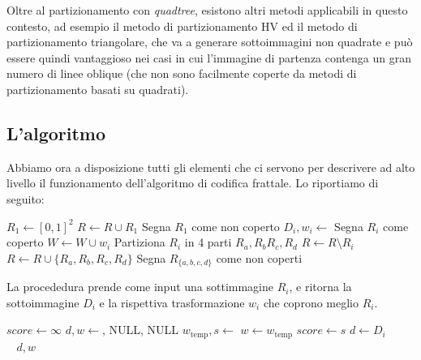 \documentclass[11pt,a4paper,appendixprefix=true,numbers=noenddot]{scrreprt}
\begin{document}
Oltre al partizionamento con \emph{quadtree}, esistono altri metodi applicabili in questo contesto, ad esempio il metodo di partizionamento HV ed il metodo di partizionamento triangolare, che va a generare sottoimmagini non quadrate e può essere quindi vantaggioso nei casi in cui l'immagine di partenza contenga un gran numero di linee oblique (che non sono facilmente coperte da metodi di partizionamento basati su quadrati).

\subsection*{L'algoritmo}

Abbiamo ora a disposizione tutti gli elementi che ci servono per descrivere ad alto livello il funzionamento dell'algoritmo di codifica frattale. Lo riportiamo di seguito:

\begin{framed}
\begin{algorithmic}
\State $R_1 \gets [0,1]^2$
\State $R \gets R \cup R_1$
\State Segna $R_1$ come non coperto
	\State $D_i, w_i \gets$   
		\State Segna $R_i$ come coperto
		\State $W \gets W \cup w_i$
	\Else	
		\State Partiziona $R_i$ in 4 parti $R_a, R_b R_c, R_d$ 
		\State $R \gets R \setminus R_i$
		\State $R \gets R \cup \{R_a, R_b, R_c, R_d\}$
		\State Segna $R_{\{a,b,c,d\}}$ come non coperti
	\EndIf
\EndWhile
\EndProcedure
\end{algorithmic}
\end{framed}

La procededura  prende come input una sottimmagine $R_i$, e ritorna la sottoimmagine $D_i$ e la rispettiva trasformazione $w_i$ che coprono meglio $R_i$.

\begin{framed}
\begin{algorithmic}
\State $score \gets \infty$
\State $d, w \gets$, NULL, NULL
	\State $w_{\text{temp}}, s \gets$ 
		\State $w \gets w_{\text{temp}}$
		\State $score \gets s$
		\State $d \gets D_i$
	\EndIf
\EndFor \\
$~~~~$\Return $d, w$
\EndProcedure
\end{algorithmic}
\end{framed}
\end{document}
